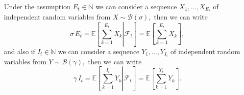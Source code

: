 \documentclass[12pt]{article}\usepackage[]{graphicx}\usepackage[]{color}
\begin{document}
Under the assumption $E_t \in \mathbb{N}$ we can consider a sequence $X_1,\ldots,X_{E_t}$ of independent random variables from $X \sim \mathcal{B}(\sigma),$ then we can write
$$
\sigma \, E_t = \mathbb{E}\left[\left. \sum_{k=1}^{E_t} X_{k} \right| \mathcal{F}_t  \right]
=  \mathbb{E}\left[\sum_{k=1}^{E_t} X_{k} \right],
$$
and also if $I_t \in \mathbb{N}$ we can consider a sequence $Y_1,\ldots,Y_{I_t}$ of independent random variables from $Y \sim \mathcal{B}(\gamma),$ then we can write
$$
\gamma \, I_t = \mathbb{E}\left[\left. \sum_{k=1}^{I_t} Y_{k} \right| \mathcal{F}_t  \right]
=  \mathbb{E}\left[\sum_{k=1}^{Y_t} Y_{k} \right].
$$
\end{document}
